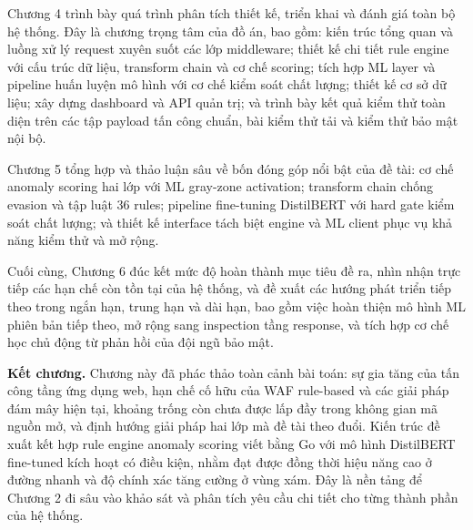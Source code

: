 \documentclass[../DoAn.tex]{subfiles}
\begin{document}
Chương 4 trình bày quá trình phân tích thiết kế, triển khai và đánh giá toàn bộ
hệ thống. Đây là chương trọng tâm của đồ án, bao gồm: kiến trúc tổng quan và
luồng xử lý request xuyên suốt các lớp middleware; thiết kế chi tiết rule engine
với cấu trúc dữ liệu, transform chain và cơ chế scoring; tích hợp ML layer và
pipeline huấn luyện mô hình với cơ chế kiểm soát chất lượng; thiết kế cơ sở dữ
liệu; xây dựng dashboard và API quản trị; và trình bày kết quả kiểm thử toàn diện
trên các tập payload tấn công chuẩn, bài kiểm thử tải và kiểm thử bảo mật nội bộ.

Chương 5 tổng hợp và thảo luận sâu về bốn đóng góp nổi bật của đề tài: cơ chế
anomaly scoring hai lớp với ML gray-zone activation; transform chain chống evasion
và tập luật 36 rules; pipeline fine-tuning DistilBERT với hard gate kiểm soát chất
lượng; và thiết kế interface tách biệt engine và ML client phục vụ khả năng kiểm
thử và mở rộng.

Cuối cùng, Chương 6 đúc kết mức độ hoàn thành mục tiêu đề ra, nhìn nhận trực
tiếp các hạn chế còn tồn tại của hệ thống, và đề xuất các hướng phát triển tiếp
theo trong ngắn hạn, trung hạn và dài hạn, bao gồm việc hoàn thiện mô hình ML
phiên bản tiếp theo, mở rộng sang inspection tầng response, và tích hợp cơ chế
học chủ động từ phản hồi của đội ngũ bảo mật.

\bigskip
\noindent\textbf{Kết chương.}
Chương này đã phác thảo toàn cảnh bài toán: sự gia tăng của tấn công tầng ứng
dụng web, hạn chế cố hữu của WAF rule-based và các giải pháp đám mây hiện tại,
khoảng trống còn chưa được lấp đầy trong không gian mã nguồn mở, và định hướng
giải pháp hai lớp mà đề tài theo đuổi. Kiến trúc đề xuất kết hợp rule engine
anomaly scoring viết bằng Go với mô hình DistilBERT fine-tuned kích hoạt có
điều kiện, nhằm đạt được đồng thời hiệu năng cao ở đường nhanh và độ chính xác
tăng cường ở vùng xám. Đây là nền tảng để Chương 2 đi sâu vào khảo sát và
phân tích yêu cầu chi tiết cho từng thành phần của hệ thống.
\end{document}
